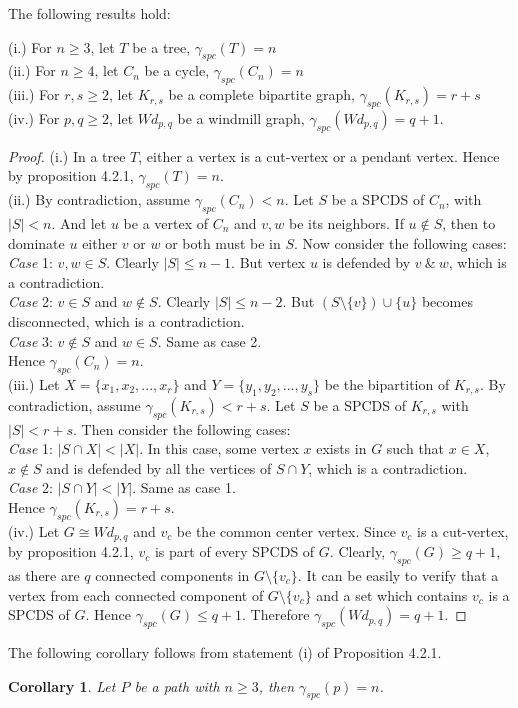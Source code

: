 \begin{proposition}
The following results hold:
\end{proposition}
\noindent (i.) For $n \geq 3$, let $T$ be a tree,  $\gamma_{spc}(T)=n$\\
(ii.) For $n \geq 4$, let $C_n$ be a cycle,  $\gamma_{spc}(C_n)=n$\\
(iii.) For $r,s \geq 2$, let $K_{r,s}$ be a complete bipartite graph,   $\gamma_{spc}(K_{r,s})=r+s$\\
(iv.) For $p,q \geq 2$, let $Wd_{p,q}$ be a windmill graph,  $\gamma_{spc}(Wd_{p,q})=q+1$.
\begin{proof}
(i.) In a tree $T$, either a vertex is a cut-vertex or a pendant vertex. Hence by proposition 4.2.1, $\gamma_{spc}(T)=n$.\\
(ii.) By contradiction, assume  $\gamma_{spc}(C_n) < n$. Let $S$ be a SPCDS of $C_n$, with $|S| < n$. And let $u$ be a vertex of $C_n$ and $v,w$ be its neighbors. If $u \notin S$, then to dominate $u$ either $v$ or $w$ or both must be in $S$. Now consider the following cases:\\
\textit{Case }1: $v,w \in S$. Clearly $|S| \leq n-1$. But vertex $u$ is defended by $v~ \&~ w$, which is a contradiction.\\
\textit{Case }2: $v\in S$ and $w \notin S$. Clearly $|S| \leq n-2$. But $(S\setminus \lbrace v \rbrace) \cup \lbrace u \rbrace$ becomes disconnected, which is a contradiction.\\
\textit{Case }3: $v \notin S$ and $w \in S$. Same as case 2.\\
Hence $\gamma_{spc}(C_n) = n$.\\
(iii.) Let $X = \lbrace x_1,x_2,...,x_r\rbrace $ and $Y=\lbrace y_1,y_2,...,y_s \rbrace $ be the bipartition of $K_{r,s}$. By contradiction, assume $\gamma_{spc}(K_{r,s}) < r+s$. Let $S$ be a SPCDS of $K_{r,s}$ with $|S| < r+s$. Then consider the following cases:\\
\textit{Case }1: $|S \cap X| < |X|$. In this case, some vertex $x$ exists in $G$ such that $x \in X$, $x \notin S$ and is defended by all the vertices of $S \cap Y$, which is a contradiction.\\
\textit{Case }2: $|S \cap Y| < |Y|$. Same as case 1.\\
Hence $\gamma_{spc}(K_{r,s}) = r+s$.\\
(iv.) Let $G \cong Wd_{p,q}$ and $v_c$ be the common center vertex. Since $v_c$ is a cut-vertex, by proposition 4.2.1, $v_c$ is part of every SPCDS of $G$. Clearly, $\gamma_{spc}(G) \geq q+1$, as there are $q$ connected components in $G \setminus \lbrace v_c \rbrace$. It can be easily to verify that a vertex from each connected component of $G \setminus \{ v_c \}$ and a set which contains $v_c$ is a SPCDS of $G$. Hence $\gamma_{spc}(G) \leq q+1$. Therefore $\gamma_{spc}(Wd_{p,q})=q+1$.
\end{proof}
\noindent The following corollary follows from statement (i) of Proposition 4.2.1.
\newtheorem{Corly}{Corollary}
\begin{Corly}
Let $P$ be a path with $n \geq 3$, then $\gamma_{spc}(p)=n$.
\end{Corly}

